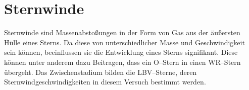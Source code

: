 \section{Sternwinde}
Sternwinde sind Massenabstoßungen in der Form von Gas aus der äußersten Hülle eines Sterns.
Da diese von unterschiedlicher Masse und Geschwindigkeit sein können, beeinflussen sie die Entwicklung eines Sterns signifikant.
Diese können unter anderem dazu Beitragen, dass ein O--Stern in einen WR--Stern übergeht.
Das Zwischenstadium bilden die LBV--Sterne, deren Sternwindgeschwindigkeiten in diesem Versuch bestimmt werden.
